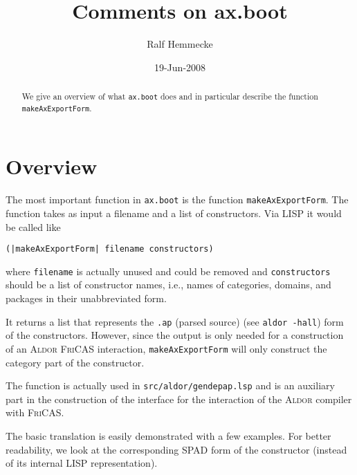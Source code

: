 \documentclass{article}
\newcommand{\file}[1]{\texttt{#1}}
\newcommand{\xAldor}{\textsc{Aldor}}
\newcommand{\xAxiom}{\textsc{FriCAS}}
\begin{document}
\title{Comments on ax.boot}
\author{Ralf Hemmecke}
\date{19-Jun-2008}
\maketitle
\begin{abstract}
  We give an overview of what \file{ax.boot} does and in particular
  describe the function \verb'makeAxExportForm'.
\end{abstract}
\tableofcontents

\section{Overview}
The most important function in \file{ax.boot} is the function
\verb'makeAxExportForm'.
%
The function takes as input a filename and a list of constructors.
Via LISP it would be called like
\begin{verbatim}
(|makeAxExportForm| filename constructors)
\end{verbatim}
where \verb'filename' is actually unused and could be removed and
\verb'constructors' should be a list of constructor names, i.e., names
of categories, domains, and packages in their unabbreviated form.

It returns a list that represents the \texttt{.ap} (parsed source)
(see \verb'aldor -hall') form of the constructors. However, since the
output is only needed for a construction of an \xAldor{} \xAxiom{}
interaction, \verb'makeAxExportForm' will only construct the category
part of the constructor.

The function is actually used in \file{src/aldor/gendepap.lsp} and is an
auxiliary part in the construction of the interface for the
interaction of the \xAldor{} compiler with \xAxiom{}.



The basic translation is easily demonstrated with a few examples. For
better readability, we look at the corresponding SPAD form of the
constructor (instead of its internal LISP representation).
\end{document}
